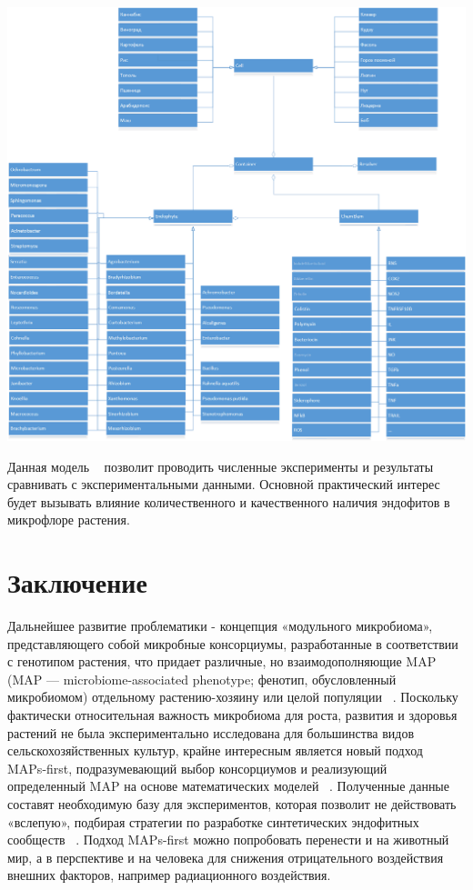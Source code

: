 \documentclass[11pt]{article}
\begin{document}
	\includegraphics[width=\textwidth]{uml_classes}
	
	Данная модель ~\cite{git} позволит проводить численные эксперименты и результаты сравнивать с экспериментальными данными. Основной практический интерес будет вызывать влияние количественного и качественного наличия эндофитов	в микрофлоре растения.
	
	\section{Заключение}
	Дальнейшее развитие проблематики - концепция «модульного микробиома», представляющего собой микробные консорциумы, разработанные в соответствии с генотипом растения, что придает различные, но взаимодополняющие MAP (MAP — microbiome-associated phenotype;  фенотип, обусловленный микробиомом) отдельному растению-хозяину или целой популяции ~\cite{j.mib.2017.11.023}. Поскольку фактически относительная важность микробиома для роста, развития и здоровья растений не была экспериментально исследована для большинства видов сельскохозяйственных культур, крайне интересным является новый подход MAPs-first, подразумевающий выбор консорциумов и реализующий определенный MAP на основе математических моделей ~\cite{j.mib.2017.11.023}. Полученные данные составят необходимую базу для экспериментов, которая позволит не действовать «вслепую», подбирая стратегии по разработке синтетических эндофитных сообществ ~\cite{ecogen17119-32}.
	Подход MAPs-first можно попробовать перенести и на животный мир, а в перспективе и на человека для снижения отрицательного воздействия внешних факторов, например радиационного воздействия.
	
\end{document}

